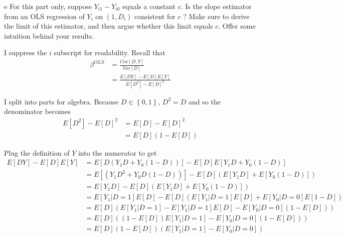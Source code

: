 \documentclass{article}
\begin{document}
\begin{problem}{e} For this part only, suppose $Y_{i 1}-Y_{i 0}$ equals a constant $c$. Is the slope estimator from an OLS regression of $Y_{i}$ on $\left(1, D_{i}\right)$ consistent for $c$ ? Make sure to derive the limit of this estimator, and then argue whether this limit equals $c$. Offer some intuition behind your results. 
\end{problem}
\begin{solution}
I suppress the $i$ subscript for readability. Recall that 
\begin{align*}
\beta^{OLS} & =\frac{Cov\left[D,Y\right]}{Var\left[D\right]}\\
 & =\frac{E\left[DY\right]-E\left[D\right]E\left[Y\right]}{E\left[D^{2}\right]-E\left[D\right]^{2}}
\end{align*}

I split into parts for algebra. Because $D\in\left\{ 0,1\right\} $,
$D^{2}=D$ and so the denominator becomes
\begin{align*}
E\left[D^{2}\right]-E\left[D\right]^{2} & =E\left[D\right]-E\left[D\right]^{2}\\
 & =E\left[D\right]\left(1-E\left[D\right]\right)
\end{align*}

Plug the definition of $Y$ into the numerator to get 
\begin{align*}
E\left[DY\right]-E\left[D\right]E\left[Y\right] & =E\left[D\left(Y_{1}D+Y_{0}\left(1-D\right)\right)\right]-E\left[D\right]E\left[Y_{1}D+Y_{0}\left(1-D\right)\right]\\
 & =E\left[\left(Y_{1}D^{2}+Y_{0}D\left(1-D\right)\right)\right]-E\left[D\right]\left(E\left[Y_{1}D\right]+E\left[Y_{0}\left(1-D\right)\right]\right)\\
 & =E\left[Y_{1}D\right]-E\left[D\right]\left(E\left[Y_{1}D\right]+E\left[Y_{0}\left(1-D\right)\right]\right)\\
 & =E\left[Y_{1}|D=1\right]E\left[D\right]-E\left[D\right]\left(E\left[Y_{1}|D=1\right]E\left[D\right]+E\left[Y_{0}|D=0\right]E\left[1-D\right]\right)\\
 & =E\left[D\right]\left(E\left[Y_{1}|D=1\right]-E\left[Y_{1}|D=1\right]E\left[D\right]-E\left[Y_{0}|D=0\right]\left(1-E\left[D\right]\right)\right)\\
 & =E\left[D\right]\left(\left(1-E\left[D\right]\right)E\left[Y_{1}|D=1\right]-E\left[Y_{0}|D=0\right]\left(1-E\left[D\right]\right)\right)\\
 & =E\left[D\right]\left(1-E\left[D\right]\right)\left(E\left[Y_{1}|D=1\right]-E\left[Y_{0}|D=0\right]\right)
\end{align*}


\end{solution}
\end{document}
